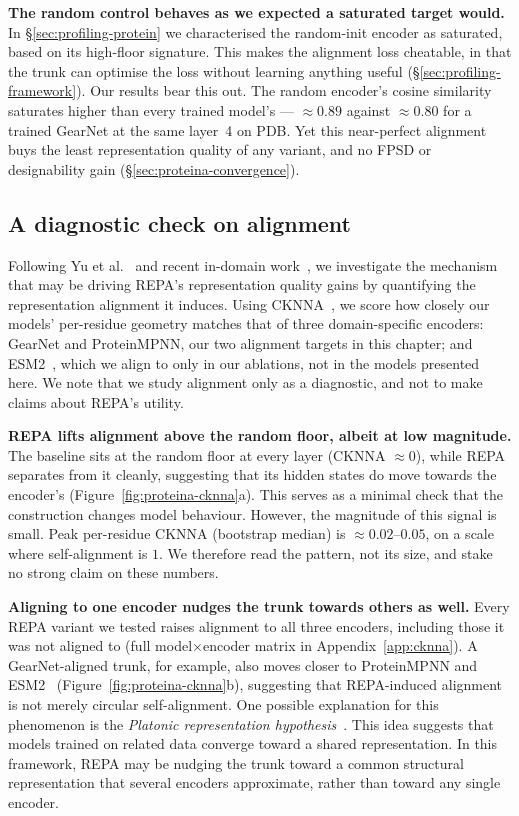 \documentclass[12pt,a4paper,twoside]{report}
\begin{document}
\textbf{The random control behaves as we expected a saturated target would.} In \S\ref{sec:profiling-protein} we characterised the random-init encoder as saturated, based on its high-floor signature. This makes the alignment loss cheatable, in that the trunk can optimise the loss without learning anything useful (\S\ref{sec:profiling-framework}). Our results bear this out. The random encoder's cosine similarity saturates higher than every trained model's --- ${\approx}0.89$ against ${\approx}0.80$ for a trained GearNet at the same layer~4 on PDB. Yet this near-perfect alignment buys the least representation quality of any variant, and no FPSD or designability gain (\S\ref{sec:proteina-convergence}).

\subsection{A diagnostic check on alignment}
\label{sec:proteina-alignment}

Following Yu et al.~\cite{REPA} and recent in-domain work~\cite{BoltzREPA}, we investigate the mechanism that may be driving REPA's representation quality gains by quantifying the representation alignment it induces. Using CKNNA~\cite{PlatonicRep}, we score how closely our models' per-residue geometry matches that of three domain-specific encoders: GearNet and ProteinMPNN, our two alignment targets in this chapter; and ESM2~\cite{ESM2}, which we align to only in our ablations, not in the models presented here. We note that we study alignment only as a diagnostic, and not to make claims about REPA's utility.

\textbf{REPA lifts alignment above the random floor, albeit at low magnitude.} The baseline sits at the random floor at every layer (CKNNA $\approx 0$), while REPA separates from it cleanly, suggesting that its hidden states do move towards the encoder's (Figure~\ref{fig:proteina-cknna}a). This serves as a minimal check that the construction changes model behaviour. However, the magnitude of this signal is small. Peak per-residue CKNNA (bootstrap median) is $\approx 0.02$--$0.05$, on a scale where self-alignment is $1$. We therefore read the pattern, not its size, and stake no strong claim on these numbers.



\textbf{Aligning to one encoder nudges the trunk towards others as well.} Every REPA variant we tested raises alignment to all three encoders, including those it was not aligned to (full model$\times$encoder matrix in Appendix~\ref{app:cknna}). A GearNet-aligned trunk, for example, also moves closer to ProteinMPNN and ESM2~\cite{ESM2} (Figure~\ref{fig:proteina-cknna}b), suggesting that REPA-induced alignment is not merely circular self-alignment. One possible explanation for this phenomenon is the \emph{Platonic representation hypothesis}~\cite{PlatonicRep}. This idea suggests that models trained on related data converge toward a shared representation. In this framework, REPA may be nudging the trunk toward a common structural representation that several encoders approximate, rather than toward any single encoder.
\end{document}
